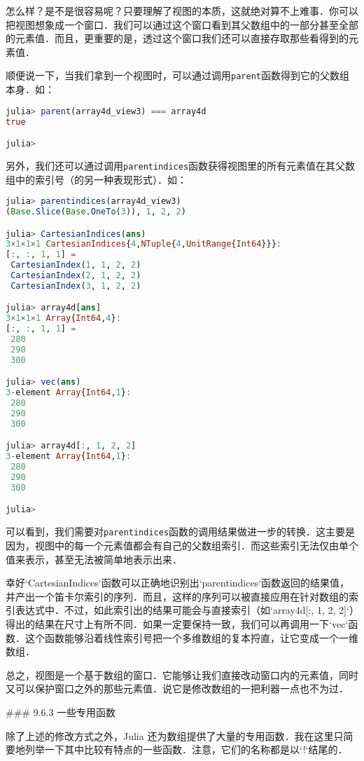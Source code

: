 怎么样？是不是很容易呢？只要理解了视图的本质，这就绝对算不上难事．你可以把视图想象成一个窗口．我们可以通过这个窗口看到其父数组中的一部分甚至全部的元素值．而且，更重要的是，透过这个窗口我们还可以直接存取那些看得到的元素值．

顺便说一下，当我们拿到一个视图时，可以通过调用\verb|parent|函数得到它的父数组本身．如：
\begin{lstlisting}[language=julia]
julia> parent(array4d_view3) === array4d
true

julia> 
\end{lstlisting}

另外，我们还可以通过调用\verb|parentindices|函数获得视图里的所有元素值在其父数组中的索引号（的另一种表现形式）．如：

\begin{lstlisting}[language=julia]
julia> parentindices(array4d_view3)
(Base.Slice(Base.OneTo(3)), 1, 2, 2)

julia> CartesianIndices(ans)
3×1×1×1 CartesianIndices{4,NTuple{4,UnitRange{Int64}}}:
[:, :, 1, 1] =
 CartesianIndex(1, 1, 2, 2)
 CartesianIndex(2, 1, 2, 2)
 CartesianIndex(3, 1, 2, 2)

julia> array4d[ans]
3×1×1×1 Array{Int64,4}:
[:, :, 1, 1] =
 280
 290
 300

julia> vec(ans)
3-element Array{Int64,1}:
 280
 290
 300

julia> array4d[:, 1, 2, 2]
3-element Array{Int64,1}:
 280
 290
 300

julia> 
\end{lstlisting}

可以看到，我们需要对\verb|parentindices|函数的调用结果做进一步的转换．这主要是因为，视图中的每一个元素值都会有自己的父数组索引．而这些索引无法仅由单个值来表示，甚至无法被简单地表示出来．

幸好`CartesianIndices`函数可以正确地识别出`parentindices`函数返回的结果值，并产出一个笛卡尔索引的序列．而且，这样的序列可以被直接应用在针对数组的索引表达式中．不过，如此索引出的结果可能会与直接索引（如`array4d[:, 1, 2, 2]`）得出的结果在尺寸上有所不同．如果一定要保持一致，我们可以再调用一下`vec`函数．这个函数能够沿着线性索引号把一个多维数组的复本捋直，让它变成一个一维数组．

总之，视图是一个基于数组的窗口．它能够让我们直接改动窗口内的元素值，同时又可以保护窗口之外的那些元素值．说它是修改数组的一把利器一点也不为过．

### 9.6.3 一些专用函数

除了上述的修改方式之外，Julia 还为数组提供了大量的专用函数．我在这里只简要地列举一下其中比较有特点的一些函数．注意，它们的名称都是以`!`结尾的．

